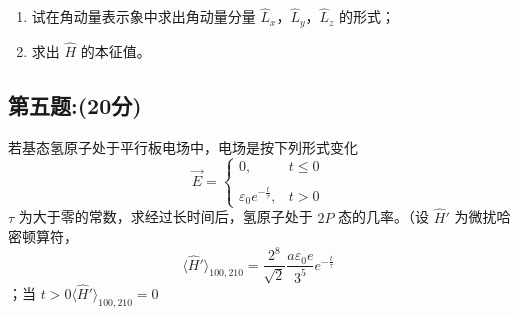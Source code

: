 \begin{enumerate}
    \item 试在角动量表示象中求出角动量分量 $\hat{L}_x$，$\hat{L}_y$，$\hat{L}_z$ 的形式；
    \item 求出 $\hat{H}$ 的本征值。
\end{enumerate}
\subsection{第五题:(20分)}
若基态氢原子处于平行板电场中，电场是按下列形式变化
$$\vec{E} = \begin{cases} 0, & t \leq 0 \\\\\varepsilon_0 e^{-\frac{t}{\tau}}, & t > 0\end{cases}~$$
$\tau$ 为大于零的常数，求经过长时间后，氢原子处于 $2P$ 态的几率。（设 $\hat{H}'$ 为微扰哈密顿算符，
$$\langle \hat{H}' \rangle_{100,210} = \frac{2^8}{\sqrt{2}} \frac{a\varepsilon_0 e}{3^5} e^{-\frac{t}{\tau}}~$$；当  $t > 0 \langle \hat{H}' \rangle_{100,210} = 0 $
